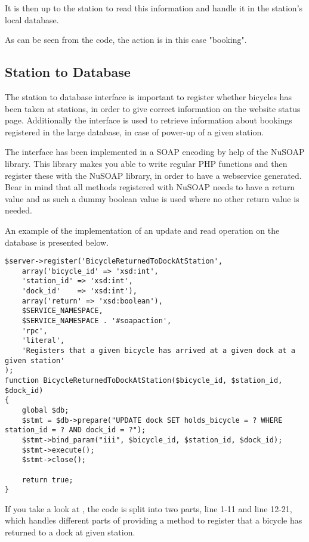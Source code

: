 It is then up to the station to read this information and handle it in the station's local database.

As can be seen from the code, the action is in this case "booking".

\subsection{Station to Database}
The station to database interface is important to register whether bicycles has been taken at stations, in order to give correct information on the website status page.
Additionally the interface is used to retrieve information about bookings registered in the large database, in case of power-up of a given station.

The interface has been implemented in a SOAP encoding by help of the NuSOAP library.
This library makes you able to write regular PHP functions and then register these with the NuSOAP library, in order to have a webservice generated.
Bear in mind that all methods registered with NuSOAP needs to have a return value and as such a dummy boolean value is used where no other return value is needed.

An example of the implementation of an update and read operation on the database is presented below.

\begin{minipage}{\textwidth}
\begin{lstlisting}[caption = {Method for registering a bicycle as been returned to a dock at a given station.}, label = {lst:bicycledockstationreturned}]
$server->register('BicycleReturnedToDockAtStation',
	array('bicycle_id' => 'xsd:int',
	'station_id' => 'xsd:int',
	'dock_id'    => 'xsd:int'),
	array('return' => 'xsd:boolean'),
	$SERVICE_NAMESPACE,
	$SERVICE_NAMESPACE . '#soapaction',
	'rpc',
	'literal',
	'Registers that a given bicycle has arrived at a given dock at a given station'
);
function BicycleReturnedToDockAtStation($bicycle_id, $station_id, $dock_id)
{
	global $db;
	$stmt = $db->prepare("UPDATE dock SET holds_bicycle = ? WHERE station_id = ? AND dock_id = ?");
	$stmt->bind_param("iii", $bicycle_id, $station_id, $dock_id);
	$stmt->execute();
	$stmt->close();
	
	return true;
}
\end{lstlisting}
\end{minipage}

If you take a look at , the code is split into two parts, line 1-11 and line 12-21, which handles different parts of providing a method to register that a bicycle has returned to a dock at given station.

